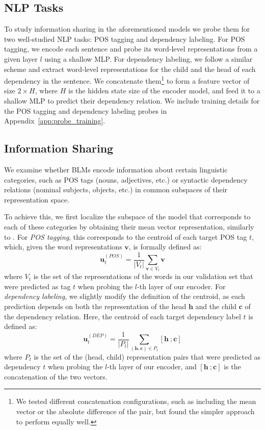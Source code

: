 \documentclass[11pt,a4paper]{article}
\begin{document}
\subsection{NLP Tasks}
\label{nlp-tasks}
To study information sharing in the aforementioned models we probe them for two well-studied NLP tasks: POS tagging and dependency labeling. For POS tagging, we encode each sentence and probe its word-level representations from a given layer $l$ using a shallow MLP. For dependency labeling, we follow a similar scheme and extract word-level representations for the child and the head of each dependency in the sentence. We concatenate them\footnote{We tested different concatenation configurations, such as including the mean vector or the absolute difference of the pair, but found the simpler approach to perform equally well.} to form a feature vector of size $2 \times H$, where $H$ is the hidden state size of the encoder model, and feed it to a shallow MLP to predict their dependency relation. We include training details for the POS tagging and dependency labeling probes in Appendix~\ref{app:probe_training}.

\subsection{Information Sharing}
\label{sec:infoshare}
We examine whether BLMs encode information about certain linguistic categories, such as POS tags (nouns, adjectives, etc.) or syntactic dependency relations (nominal subjects, objects, etc.) in common subspaces of their representation space.

To achieve this, we first localize the subspace of the model that corresponds to each of these categories by obtaining their mean vector representation, similarly to \citet{libovicky_language_2020}. For \textit{POS tagging}, this corresponds to the centroid of each target POS tag $t$, which, given the word representations $\mathbf{v}$, is formally defined as:
\begin{equation}
    \mathbf{u}_{t}^{(POS)} = \frac{1}{|V_t|} \sum_{\mathbf{v} \in V_t} \mathbf{v}
\end{equation}
where $V_t$ is the set of the representations of the words in our validation set that were predicted as tag $t$ when probing the $l$-th layer of our encoder. For \textit{dependency labeling}, we slightly modify the definition of the centroid, as each prediction depends on both the representation of the head $\mathbf{h}$ and the child $\mathbf{c}$ of the dependency relation. Here, the centroid of each target dependency label $t$ is defined as:
\begin{equation}
    \mathbf{u}_{t}^{(DEP)} = \frac{1}{|P_t|} \sum_{(\mathbf{h}, \mathbf{c}) \in P_t} [\mathbf{h} ~; \mathbf{c}]
\end{equation}
where $P_t$ is the set of the (head, child) representation pairs that were predicted as dependency $t$ when probing the $l$-th layer of our encoder, and $[\mathbf{h} ~; \mathbf{c}]$ is the concatenation of the two vectors.
\end{document}
